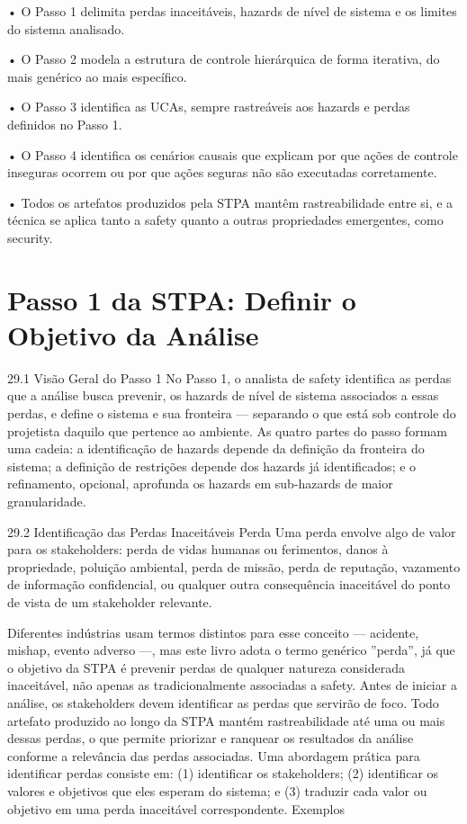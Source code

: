 • O Passo 1 delimita perdas inaceitáveis, hazards de nível de sistema e os limites do sistema analisado.

• O Passo 2 modela a estrutura de controle hierárquica de forma iterativa, do mais genérico ao mais específico.

• O Passo 3 identifica as UCAs, sempre rastreáveis aos hazards e perdas definidos no Passo 1.

• O Passo 4 identifica os cenários causais que explicam por que ações de controle inseguras ocorrem ou por que ações seguras não são executadas corretamente.

• Todos os artefatos produzidos pela STPA mantêm rastreabilidade entre si, e a técnica se aplica tanto a safety quanto a outras propriedades emergentes, como security.

\chapter{Passo 1 da STPA: Definir o Objetivo da Análise}

29.1 Visão Geral do Passo 1 No Passo 1, o analista de safety identifica as perdas que a análise busca prevenir, os hazards de nível de sistema associados a essas perdas, e define o sistema e sua fronteira — separando o que está sob controle do projetista daquilo que pertence ao ambiente. As quatro partes do passo formam uma cadeia: a identificação de hazards depende da definição da fronteira do sistema; a definição de restrições depende dos hazards já identificados; e o refinamento, opcional, aprofunda os hazards em sub-hazards de maior granularidade.

29.2 Identificação das Perdas Inaceitáveis Perda Uma perda envolve algo de valor para os stakeholders: perda de vidas humanas ou ferimentos, danos à propriedade, poluição ambiental, perda de missão, perda de reputação, vazamento de informação confidencial, ou qualquer outra consequência inaceitável do ponto de vista de um stakeholder relevante.

Diferentes indústrias usam termos distintos para esse conceito — acidente, mishap, evento adverso —, mas este livro adota o termo genérico ”perda”, já que o objetivo da STPA é prevenir perdas de qualquer natureza considerada inaceitável, não apenas as tradicionalmente associadas a safety. Antes de iniciar a análise, os stakeholders devem identificar as perdas que servirão de foco. Todo artefato produzido ao longo da STPA mantém rastreabilidade até uma ou mais dessas perdas, o que permite priorizar e ranquear os resultados da análise conforme a relevância das perdas associadas. Uma abordagem prática para identificar perdas consiste em: (1) identificar os stakeholders; (2) identificar os valores e objetivos que eles esperam do sistema; e (3) traduzir cada valor ou objetivo em uma perda inaceitável correspondente. Exemplos

